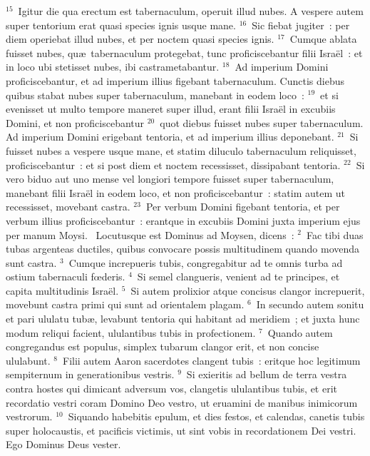 ${}^{15}$~Igitur die qua erectum est tabernaculum, operuit illud nubes. A vespere autem super tentorium erat quasi species ignis usque mane.
${}^{16}$~Sic fiebat jugiter~: per diem operiebat illud nubes, et per noctem quasi species ignis.
${}^{17}$~Cumque ablata fuisset nubes, qu\ae\ tabernaculum protegebat, tunc proficiscebantur filii Isra\"el~: et in loco ubi stetisset nubes, ibi castrametabantur.
${}^{18}$~Ad imperium Domini proficiscebantur, et ad imperium illius figebant tabernaculum. Cunctis diebus quibus stabat nubes super tabernaculum, manebant in eodem loco~:
${}^{19}$~et si evenisset ut multo tempore maneret super illud, erant filii Isra\"el in excubiis Domini, et non proficiscebantur
${}^{20}$~quot diebus fuisset nubes super tabernaculum. Ad imperium Domini erigebant tentoria, et ad imperium illius deponebant.
${}^{21}$~Si fuisset nubes a vespere usque mane, et statim diluculo tabernaculum reliquisset, proficiscebantur~: et si post diem et noctem recessisset, dissipabant tentoria.
${}^{22}$~Si vero biduo aut uno mense vel longiori tempore fuisset super tabernaculum, manebant filii Isra\"el in eodem loco, et non proficiscebantur~: statim autem ut recessisset, movebant castra.
${}^{23}$~Per verbum Domini figebant tentoria, et per verbum illius proficiscebantur~: erantque in excubiis Domini juxta imperium ejus per manum Moysi.
~Locutusque est Dominus ad Moysen, dicens~:
${}^{2}$~Fac tibi duas tubas argenteas ductiles, quibus convocare possis multitudinem quando movenda sunt castra.
${}^{3}$~Cumque increpueris tubis, congregabitur ad te omnis turba ad ostium tabernaculi fœderis.
${}^{4}$~Si semel clangueris, venient ad te principes, et capita multitudinis Isra\"el.
${}^{5}$~Si autem prolixior atque concisus clangor increpuerit, movebunt castra primi qui sunt ad orientalem plagam.
${}^{6}$~In secundo autem sonitu et pari ululatu tub\ae , levabunt tentoria qui habitant ad meridiem~; et juxta hunc modum reliqui facient, ululantibus tubis in profectionem.
${}^{7}$~Quando autem congregandus est populus, simplex tubarum clangor erit, et non concise ululabunt.
${}^{8}$~Filii autem Aaron sacerdotes clangent tubis~: eritque hoc legitimum sempiternum in generationibus vestris.
${}^{9}$~Si exieritis ad bellum de terra vestra contra hostes qui dimicant adversum vos, clangetis ululantibus tubis, et erit recordatio vestri coram Domino Deo vestro, ut eruamini de manibus inimicorum vestrorum.
${}^{10}$~Siquando habebitis epulum, et dies festos, et calendas, canetis tubis super holocaustis, et pacificis victimis, ut sint vobis in recordationem Dei vestri. Ego Dominus Deus vester.



